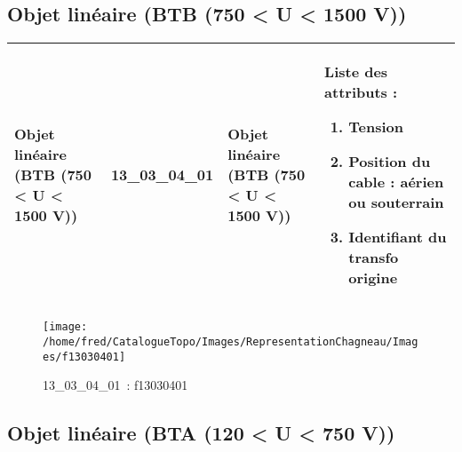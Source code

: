 \documentclass[12pt,titlepage]{book}
\begin{document}
\subsection{Objet linéaire (BTB (750 < U < 1500 V))}
\noindent
\vspace{\baselineskip}

\renewcommand{\arraystretch}{1.2}
\begin{supertabular}{|p{10cm}|c|p{13cm}|p{12cm}|}
 Objet linéaire (BTB (750 < U < 1500 V)) & 13\_03\_04\_01 & Objet linéaire (BTB (750 < U < 1500 V)) & Liste des attributs :
\begin{enumerate}
  \item Tension  \item Position du cable : aérien ou souterrain  \item Identifiant du transfo origine\end{enumerate}
\\
\hline
\end{supertabular}
\begin{figure}[h!]
  \hfill         %
  \begin{minipage}[t]{3cm}
    \begin{center}
      \texttt{[image: /home/fred/CatalogueTopo/Images/RepresentationChagneau/Images/f13030401]}
      \caption[~13\_03\_04\_01]{\small{13\_03\_04\_01~:} \tiny{f13030401}}\label{f13030401}
    \end{center}
  \end{minipage}
\end{figure}


\subsection{Objet linéaire (BTA (120 < U < 750 V))}
\noindent
\vspace{\baselineskip}
\end{document}
